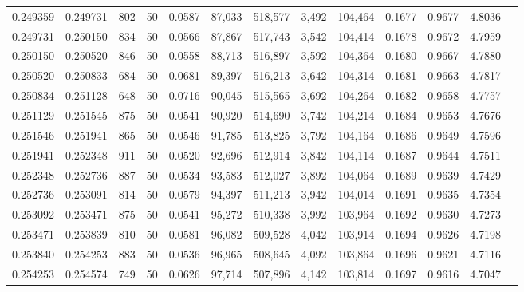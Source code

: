 \begin{tabular}{rrrrrrrrrrrrr}
0.249359 & 0.249731 &   802 &  50 &                                     0.0587 &  87,033 & 518,577 &   3,492 & 104,464 & 0.1677 & 0.9677 & 4.8036 \\
0.249731 & 0.250150 &   834 &  50 &                                     0.0566 &  87,867 & 517,743 &   3,542 & 104,414 & 0.1678 & 0.9672 & 4.7959 \\
0.250150 & 0.250520 &   846 &  50 &                                     0.0558 &  88,713 & 516,897 &   3,592 & 104,364 & 0.1680 & 0.9667 & 4.7880 \\
0.250520 & 0.250833 &   684 &  50 &                                     0.0681 &  89,397 & 516,213 &   3,642 & 104,314 & 0.1681 & 0.9663 & 4.7817 \\
0.250834 & 0.251128 &   648 &  50 &                                     0.0716 &  90,045 & 515,565 &   3,692 & 104,264 & 0.1682 & 0.9658 & 4.7757 \\
0.251129 & 0.251545 &   875 &  50 &                                     0.0541 &  90,920 & 514,690 &   3,742 & 104,214 & 0.1684 & 0.9653 & 4.7676 \\
0.251546 & 0.251941 &   865 &  50 &                                     0.0546 &  91,785 & 513,825 &   3,792 & 104,164 & 0.1686 & 0.9649 & 4.7596 \\
0.251941 & 0.252348 &   911 &  50 &                                     0.0520 &  92,696 & 512,914 &   3,842 & 104,114 & 0.1687 & 0.9644 & 4.7511 \\
0.252348 & 0.252736 &   887 &  50 &                                     0.0534 &  93,583 & 512,027 &   3,892 & 104,064 & 0.1689 & 0.9639 & 4.7429 \\
0.252736 & 0.253091 &   814 &  50 &                                     0.0579 &  94,397 & 511,213 &   3,942 & 104,014 & 0.1691 & 0.9635 & 4.7354 \\
0.253092 & 0.253471 &   875 &  50 &                                     0.0541 &  95,272 & 510,338 &   3,992 & 103,964 & 0.1692 & 0.9630 & 4.7273 \\
0.253471 & 0.253839 &   810 &  50 &                                     0.0581 &  96,082 & 509,528 &   4,042 & 103,914 & 0.1694 & 0.9626 & 4.7198 \\
0.253840 & 0.254253 &   883 &  50 &                                     0.0536 &  96,965 & 508,645 &   4,092 & 103,864 & 0.1696 & 0.9621 & 4.7116 \\
0.254253 & 0.254574 &   749 &  50 &                                     0.0626 &  97,714 & 507,896 &   4,142 & 103,814 & 0.1697 & 0.9616 & 4.7047 \\

\end{tabular}
